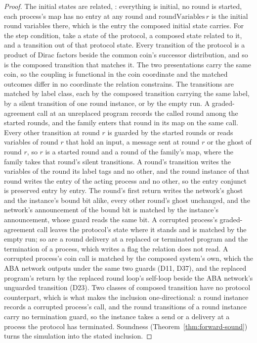 \begin{proof}\leanok
  The initial states are related, : everything is initial, no round is started, each process's map has no entry at any round and $\mathrm{roundVariables}\,r$ is the initial round variables there, which is the entry the composed initial state carries.
  For the step condition, take a state of the protocol, a composed state related to it, and a transition out of that protocol state.
  Every transition of the protocol is a product of Dirac factors beside the common coin's successor distribution, and so is the composed transition that matches it.
  The two presentations carry the same coin, so the coupling is functional in the coin coordinate and the matched outcomes differ in no coordinate the relation constrains.
  The transitions are matched by label class, each by the composed transition carrying the same label, by a silent transition of one round instance, or by the empty run.
  A graded-agreement call at an unreplaced program records the called round among the started rounds, and the family enters that round in its map on the same call.
  Every other transition at round $r$ is guarded by the started rounds or reads variables of round $r$ that hold an input, a message sent at round $r$ or the ghost of round $r$, so $r$ is a started round and a round of the family's map, where the family takes that round's silent transitions.
  A round's transition writes the variables of the round its label tags and no other, and the round instance of that round writes the entry of the acting process and no other, so the entry conjunct is preserved entry by entry.
  The round's first return writes the network's ghost and the instance's bound bit alike, every other round's ghost unchanged, and the network's announcement of the bound bit is matched by the instance's announcement, whose guard reads the same bit.
  A corrupted process's graded-agreement call leaves the protocol's state where it stands and is matched by the empty run; so are a round delivery at a replaced or terminated program and the termination of a process, which writes a flag the relation does not read.
  A corrupted process's coin call is matched by the composed system's own, which the ABA network outputs under the same two guards (D11, D37), and the replaced program's return by the replaced round loop's self-loop beside the ABA network's unguarded transition (D23).
  Two classes of composed transition have no protocol counterpart, which is what makes the inclusion one-directional: a round instance records a corrupted process's call, and the round transitions of a round instance carry no termination guard, so the instance takes a send or a delivery at a process the protocol has terminated.
  Soundness (Theorem~\ref{thm:forward-sound}) turns the simulation  into the stated inclusion.
\end{proof}

